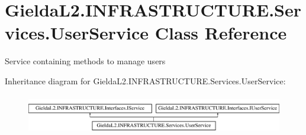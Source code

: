 \hypertarget{class_gielda_l2_1_1_i_n_f_r_a_s_t_r_u_c_t_u_r_e_1_1_services_1_1_user_service}{}\section{Gielda\+L2.\+I\+N\+F\+R\+A\+S\+T\+R\+U\+C\+T\+U\+R\+E.\+Services.\+User\+Service Class Reference}
\label{class_gielda_l2_1_1_i_n_f_r_a_s_t_r_u_c_t_u_r_e_1_1_services_1_1_user_service}


Service containing methods to manage users  


Inheritance diagram for Gielda\+L2.\+I\+N\+F\+R\+A\+S\+T\+R\+U\+C\+T\+U\+R\+E.\+Services.\+User\+Service\+:\begin{figure}[H]
\begin{center}
\leavevmode
\includegraphics[height=1.755486cm]{class_gielda_l2_1_1_i_n_f_r_a_s_t_r_u_c_t_u_r_e_1_1_services_1_1_user_service}
\end{center}
\end{figure}
